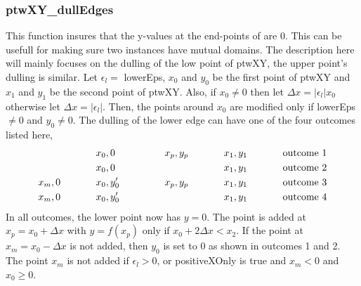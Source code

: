 \subsubsection{ptwXY\_dullEdges}
This function insures that the y-values at the end-points of   are 0. This can be usefull for making
sure two  instances have mutual domains.
The description here will mainly focuses on the dulling of the low point of ptwXY, the upper point's dulling is similar.
Let $\epsilon_l =$ lowerEps, $x_0$ and $y_0$ be the first point of ptwXY and $x_1$ and $y_1$ be the second point of ptwXY.
Also, if $x_0 \ne 0$ then let $\Delta x = |\epsilon_l| x_0$ otherwise let $\Delta x = |\epsilon_l|$.
Then, the points around $x_0$ are modified only if lowerEps $\ne 0$ and $y_0 \ne 0$.
The dulling of the lower edge can have one of the four outcomes listed here,
\begin{eqnarray}
                        & x_0, 0    & \hskip .5 in x_p, y_p            \hskip .5 in x_1, y_1 \hskip .5 in {\rm outcome \ 1} \nonumber \\
                        & x_0, 0    & \hskip .5 in \hphantom{x_p, y_p} \hskip .5 in x_1, y_1 \hskip .5 in {\rm outcome \ 2} \nonumber \\
    x_m, 0 \hskip .5 in & x_0, y'_0 & \hskip .5 in x_p, y_p            \hskip .5 in x_1, y_1 \hskip .5 in {\rm outcome \ 3} \nonumber \\
    x_m, 0 \hskip .5 in & x_0, y'_0 & \hskip .5 in \hphantom{x_p, y_p} \hskip .5 in x_1, y_1 \hskip .5 in {\rm outcome \ 4} \nonumber
\end{eqnarray}
In all outcomes, the lower point now has $y = 0$.
The point is added at $x_p = x_0 + \Delta x$ with $y = f(x_p)$ only if $x_0 + 2 \Delta x < x_2$.
If the point at $x_m = x_0 - \Delta x$ is not added, then $y_0$ is set to 0 as shown in outcomes 1 and 2.
The point $x_m$ is not added if $\epsilon_l > 0$, or positiveXOnly is true and $x_m < 0$ and $x_0 \ge 0$.

